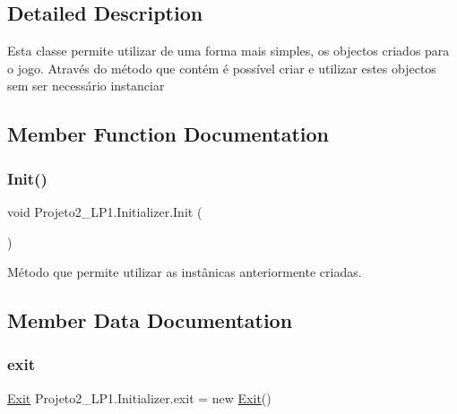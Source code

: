\subsection{Detailed Description}
Esta classe permite utilizar de uma forma mais simples, os objectos criados para o jogo. Através do método que contém é possível criar e utilizar estes objectos sem ser necessário instanciar 



\subsection{Member Function Documentation}
\mbox{\label{class_projeto2___l_p1_1_1_initializer_a79569fa3984fb673f2d5751495970e64}} 
\subsubsection{\texorpdfstring{Init()}{Init()}}
{\footnotesize\ttfamily void Projeto2\+\_\+\+L\+P1.\+Initializer.\+Init (\begin{DoxyParamCaption}{ }\end{DoxyParamCaption})\hspace{0.3cm}{\ttfamily [inline]}}



Método que permite utilizar as instânicas anteriormente criadas. 



\subsection{Member Data Documentation}
\mbox{\label{class_projeto2___l_p1_1_1_initializer_a659e31f7b56c02922edc81ca6edd550c}} 
\subsubsection{\texorpdfstring{exit}{exit}}
{\footnotesize\ttfamily \mbox{\hyperlink{class_projeto2___l_p1_1_1_exit}{Exit}} Projeto2\+\_\+\+L\+P1.\+Initializer.\+exit = new \mbox{\hyperlink{class_projeto2___l_p1_1_1_exit}{Exit}}()}



